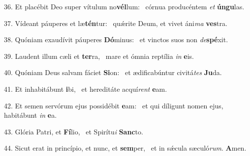 36. Et placébit Deo super vítulum no\textbf{vél}lum: \ast\  córnua producéntem \textit{et} \textbf{ún}\textbf{gu}las.\

37. Vídeant páuperes et læ\textbf{tén}tur: \ast\  quǽrite Deum, et vivet áni\textit{ma} \textbf{ves}tra.\

38. Quóniam exaudívit páuperes \textbf{Dó}minus: \ast\  et vinctos suos non \textit{de}\textbf{spé}xit.\

39. Laudent illum cæli et \textbf{ter}ra, \ast\  mare et ómnia reptília \textit{in} \textbf{e}is.\

40. Quóniam Deus salvam fáciet \textbf{Si}on: \ast\  et ædificabúntur civitá\textit{tes} \textbf{Ju}da.\

41. Et inhabitábunt \textbf{i}bi, \ast\  et hereditáte acquí\textit{rent} \textbf{e}am.\

42. Et semen servórum ejus possidébit \textbf{e}am: \ast\  et qui díligunt nomen ejus, habitábunt \textit{in} \textbf{e}a.\

43. Glória Patri, et \textbf{Fí}lio, \ast\  et Spirítu\textit{i} \textbf{Sanc}to.\

44. Sicut erat in princípio, et nunc, et \textbf{sem}per, \ast\  et in sǽcula sæculó\textit{rum}. \textbf{A}men.\

